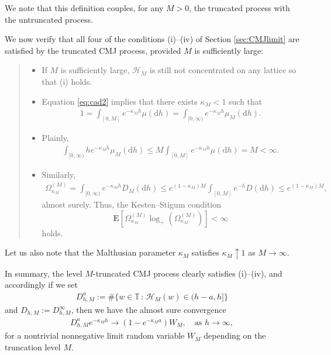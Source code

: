 \documentclass[a4,12pt]{amsart}
\numberwithin{equation}{section}
\begin{document}
	We note that this definition couples, for any $ M > 0$, the truncated process with the untruncated process.

	We now verify that all four of the conditions (i)--(iv) of Section \ref{sec:CMJlimit} are satisfied by the truncated CMJ process, provided $M$ is sufficiently large:
\begin{quote}
\normalsize
    \begin{itemize}
	\item[(i)] 	If $M$ is sufficiently large, $\mathcal{H}_M$ is still not concentrated on any lattice so that (i) holds.
        \item[(ii)] Equation \eqref{eq:cad2} implies that there exists $\kappa_M < 1$ such that 
      \begin{align} \label{eq:malthusian}
		1 = \int_{[0,M]} e^{ - \kappa_M h} \mu(\mathrm{d}h) = \int_{[0,\infty)} e^{- \kappa_M h } \mu_M(\mathrm{d}h).
	\end{align}
    \item[(iii)] Plainly, 
    \begin{align*}
    \int_{[0,\infty)} h e^{- \kappa_M h } \mu_M(\mathrm{d}h) \leq M \int_{[0,M]} e^{ - \kappa_M h} \mu(\mathrm{d}h) = M <\infty.
    \end{align*}
\item[(iv)] Similarly,
  \begin{align*}
	  \Omega_{\kappa_M}^{(M)} = \int_{[0,\infty)} e^{ - \kappa_M h} D_M(\mathrm{d}h) \leq e^{ (1-\kappa_M)M} \int_{[0,M]} e^{ - h} D (\mathrm{d}h) \leq e^{ (1-\kappa_M)M},
    \end{align*}
    almost surely.
    Thus, the Kesten--Stigum condition $$\mathbf{E}\left[ \Omega_{\kappa_M}^{(M)} \log_+\left( \Omega_{\kappa_M}^{(M)} \right) \right] < \infty$$ 
    holds. 
	\end{itemize}
    \end{quote}

Let us also note that the Malthusian parameter $\kappa_M$ satisfies $\kappa_M \uparrow 1$ as $M \to \infty$.

In summary, the level $M$-truncated CMJ process clearly satisfies (i)--(iv), and accordingly if we set 
\begin{align*}
D_{h,M}^a := \# \{ w \in \mathbb{T} \,:\,  \mathcal{H}_M(w) \in (h-a,h]  \}
\end{align*}
and $D_{h,M} := D_{h,M}^\infty$, then we have the almost sure convergence
	\begin{align} \label{eq:conve}
		D_{h,M}^a e^{ - \kappa_M h} \to \left(1 - e^{ - \kappa_M a }\right)W_M, \quad\text{as }  h \to \infty,
	\end{align}
for a nontrivial nonnegative limit random variable $W_M$ depending on the truncation level $M$.
\end{document}
